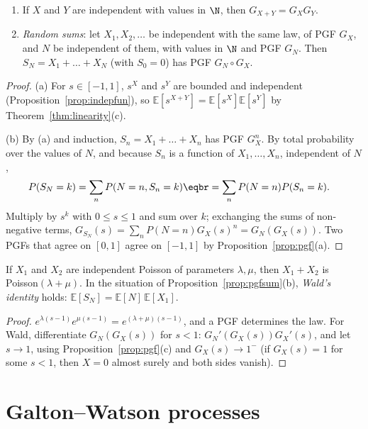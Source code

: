 \begin{proposition}\label{prop:pgfsum}
\begin{enumerate}[label=(\alph*)]
\item If $X$ and $Y$ are independent with values in $\N$, then $G_{X+Y}=G_XG_Y$.
\item \emph{Random sums}: let $X_1,X_2,\ldots$ be independent with the same law, of PGF $G_X$, and $N$ be independent of
them, with values in $\N$ and PGF $G_N$. Then $S_N=X_1+\dots+X_N$ (with $S_0=0$) has PGF $G_N\circ G_X$.
\end{enumerate}
\end{proposition}
\begin{proof}
(a) For $s\in[-1,1]$, $s^X$ and $s^Y$ are bounded and independent (Proposition~\ref{prop:indepfun}), so
$\mathbb E[s^{X+Y}]=\mathbb E[s^X]\mathbb E[s^Y]$ by Theorem~\ref{thm:linearity}(c).

(b) By (a) and induction, $S_n=X_1+\dots+X_n$ has PGF $G_X^n$. By total probability over the values of $N$, and
because $S_n$ is a function of $X_1,\dots,X_n$, independent of $N$,
\[
\begin{aligned}P(S_N=k)&=\sum_nP(N=n,S_n=k)\eqbr=\sum_nP(N=n)P(S_n=k).\end{aligned}
\]
Multiply by $s^k$ with $0\le s\le1$ and sum over $k$; exchanging the sums of non-negative terms,
$G_{S_N}(s)=\sum_nP(N=n)G_X(s)^n=G_N(G_X(s))$. Two PGFs that agree on $[0,1]$ agree on $[-1,1]$ by
Proposition~\ref{prop:pgf}(a).
\end{proof}

\begin{corollary}\label{cor:wald}
If $X_1$ and $X_2$ are independent Poisson of parameters $\lambda,\mu$, then $X_1+X_2$ is Poisson$(\lambda+\mu)$. In the situation of
Proposition~\ref{prop:pgfsum}(b), \emph{Wald's identity} holds: $\mathbb E[S_N]=\mathbb E[N]\,\mathbb E[X_1]$.
\end{corollary}
\begin{proof}
$e^{\lambda(s-1)}e^{\mu(s-1)}=e^{(\lambda+\mu)(s-1)}$, and a PGF determines the law. For Wald, differentiate
$G_N(G_X(s))$ for $s<1$: $G_N'(G_X(s))G_X'(s)$, and let $s\to1$, using Proposition~\ref{prop:pgf}(c) and $G_X(s)\to1^-$ (if
$G_X(s)=1$ for some $s<1$, then $X=0$ almost surely and both sides vanish).
\end{proof}

\section{Galton--Watson processes}

